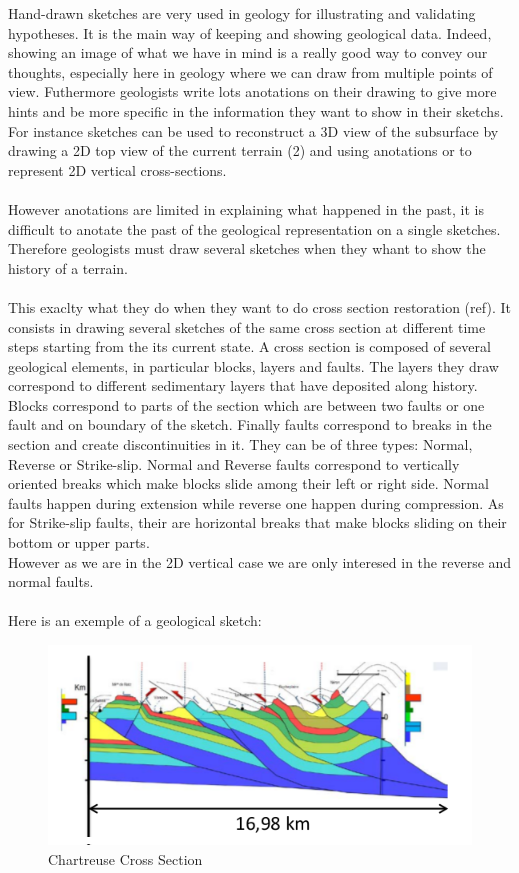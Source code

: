 \documentclass[12pt, a4paper]{memoir} %
\begin{document}
Hand-drawn sketches are very used in geology for illustrating and validating hypotheses. It is the main way of keeping and showing geological data. Indeed, showing an image of what we have in mind is a really good way to convey our thoughts, especially here in geology where we can draw from multiple points of view. Futhermore geologists write lots anotations on their drawing to give more hints and be more specific in the information they want to show in their sketchs. 
For instance sketches can be used to reconstruct a 3D view of the subsurface by drawing a 2D top view of the current terrain (2) and using anotations or to represent 2D vertical cross-sections. \\\\

However anotations are limited in explaining what happened in the past, it is difficult to anotate the past of the geological representation on a single sketches. Therefore geologists must draw several sketches when they whant to show the history of a terrain. \\\\

This exaclty what they do when they want to do cross section restoration (ref). It consists in drawing several sketches of the same cross section at different time steps starting from the its current state. A cross section is composed of several geological elements, in particular blocks, layers and faults. The layers they draw correspond to different sedimentary layers that have deposited  along history. Blocks correspond to parts of the section which are between two faults or one fault and on boundary of the sketch. Finally faults correspond to breaks in the section and create discontinuities in it. They can be of three types:
Normal, Reverse or Strike-slip. Normal and Reverse faults correspond to vertically oriented breaks which make blocks slide among their left or right side. Normal faults happen during extension while reverse one happen during compression. As for Strike-slip faults, their are horizontal breaks that make blocks sliding on their bottom or upper parts.\\
However as we are in the 2D vertical case we are only interesed in the reverse and normal faults.\\\\
Here is an exemple of a geological sketch: 
\begin{figure}[H]
	\centering
	\includegraphics[scale=0.8]{Wraped_Section.png}
	\caption{Chartreuse Cross Section}
\end{figure}
\end{document}
